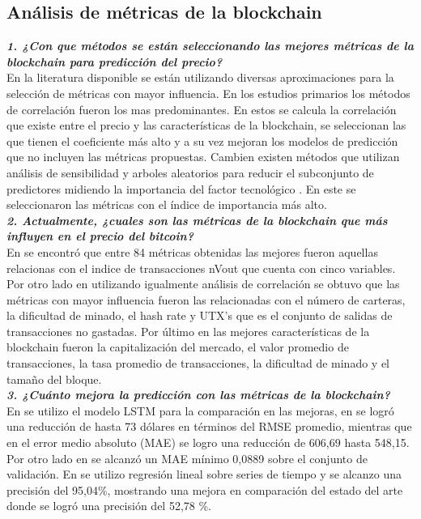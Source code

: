 \subsection{Análisis de métricas de la blockchain}

\textbf{\textit{1. ¿Con que métodos se están seleccionando las mejores métricas de la blockchain para predicción del precio?}}\\
En la literatura disponible se están utilizando diversas aproximaciones para la selección de métricas con mayor influencia. En los estudios primarios los métodos de correlación \parencite{jiBestFeatureSelection2019,saadCharacterizingBlockchainbasedCryptocurrencies2018} fueron los mas predominantes. En estos se calcula la correlación que existe entre el precio y las características de la blockchain, se seleccionan las que tienen el coeficiente más alto y a su vez mejoran los modelos de predicción que no incluyen las métricas propuestas.
Cambien existen métodos que utilizan análisis de sensibilidad y arboles aleatorios para reducir el subconjunto de predictores midiendo la importancia del factor tecnológico \parencite{chenMachineLearningModel2021}. En este se seleccionaron las métricas con el índice de importancia más alto.\\

\textbf{\textit{2. Actualmente, ¿cuales son las métricas de la blockchain que más influyen en el precio del bitcoin?}}\\
En \parencite{jiBestFeatureSelection2019} se encontró que entre 84 métricas obtenidas las mejores fueron aquellas relacionas con el indice de transacciones nVout que cuenta con cinco variables.
Por otro lado en \parencite{saadCharacterizingBlockchainbasedCryptocurrencies2018} utilizando igualmente análisis de correlación se obtuvo que las métricas con mayor influencia fueron las relacionadas con el número de carteras, la dificultad de minado, el hash rate y UTX's que es el conjunto de salidas de transacciones no gastadas.
Por último en \parencite{chenMachineLearningModel2021} las mejores características de la blockchain fueron la capitalización del mercado, el valor promedio de transacciones, la tasa promedio de transacciones, la dificultad de minado y el tamaño del bloque.\\

\textbf{\textit{3. ¿Cuánto mejora la predicción con las métricas de la blockchain?}}\\
En \parencite{saadCharacterizingBlockchainbasedCryptocurrencies2018,chenMachineLearningModel2021} se utilizo el modelo LSTM para la comparación en las mejoras, en \parencite{chenMachineLearningModel2021} se logró una reducción de hasta 73 dólares en términos del RMSE promedio, mientras que en el error medio absoluto (MAE) se logro una reducción de 606,69 hasta 548,15. Por otro lado en \parencite{saadCharacterizingBlockchainbasedCryptocurrencies2018} se alcanzó un MAE mínimo 0,0889 sobre el conjunto de validación.
En \parencite{jiBestFeatureSelection2019} se utilizo regresión lineal sobre series de tiempo y se alcanzo una precisión del 95,04\%, mostrando una mejora en comparación del estado del arte \parencite{mcnallyPredictingPriceBitcoin2018} donde se logró una precisión del 52,78 \%.

